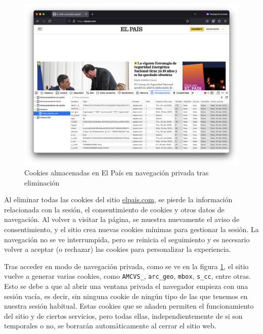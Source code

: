 \begin{figure}[H]
    \centering
    \includegraphics[width=\textwidth]{cookies_pais_npriv.png}
    \caption{Cookies almacenadas en El País en navegación privada tras eliminación}
    \label{fig:cookies_pais_npriv}
\end{figure}

Al eliminar todas las cookies del sitio \url{elpais.com}, se pierde la información relacionada con la sesión, el consentimiento de cookies y otros datos de navegación. Al volver a visitar la página, se muestra nuevamente el aviso de consentimiento, y el sitio crea nuevas cookies mínimas para gestionar la sesión. La navegación no se ve interrumpida, pero se reinicia el seguimiento y es necesario volver a aceptar (o rechazar) las cookies para personalizar la experiencia.

Tras acceder en modo de navegación privada, como se ve en la figura \ref{fig:cookies_pais_npriv}, el sitio vuelve a generar varias cookies, como \texttt{AMCVS\_}, \texttt{arc\_geo}, \texttt{mbox}, \texttt{s\_cc}, entre otras. Esto se debe a que al abrir una ventana privada el navegador empieza con una sesión vacía, es decir, sin ninguna cookie de ningún tipo de las que tenemos en nuestra sesión habitual. Estas cookies que se añaden permiten el funcionamiento del sitio y de ciertos servicios, pero todas ellas, independientemente de si son temporales o no, se borrarán automáticamente al cerrar el sitio web.
